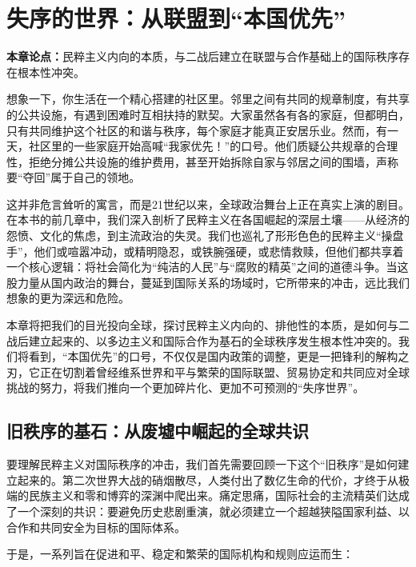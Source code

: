 \chapter{失序的世界：从联盟到“本国优先”}

\textbf{本章论点：}民粹主义内向的本质，与二战后建立在联盟与合作基础上的国际秩序存在根本性冲突。

想象一下，你生活在一个精心搭建的社区里。邻里之间有共同的规章制度，有共享的公共设施，有遇到困难时互相扶持的默契。大家虽然各有各的家庭，但都明白，只有共同维护这个社区的和谐与秩序，每个家庭才能真正安居乐业。然而，有一天，社区里的一些家庭开始高喊“我家优先！”的口号。他们质疑公共规章的合理性，拒绝分摊公共设施的维护费用，甚至开始拆除自家与邻居之间的围墙，声称要“夺回”属于自己的领地。

这并非危言耸听的寓言，而是21世纪以来，全球政治舞台上正在真实上演的剧目。在本书的前几章中，我们深入剖析了民粹主义在各国崛起的深层土壤——从经济的怨愤、文化的焦虑，到主流政治的失灵。我们也巡礼了形形色色的民粹主义“操盘手”，他们或喧嚣冲动，或精明隐忍，或铁腕强硬，或悲情救赎，但他们都共享着一个核心逻辑：将社会简化为“纯洁的人民”与“腐败的精英”之间的道德斗争。当这股力量从国内政治的舞台，蔓延到国际关系的场域时，它所带来的冲击，远比我们想象的更为深远和危险。

本章将把我们的目光投向全球，探讨民粹主义内向的、排他性的本质，是如何与二战后建立起来的、以多边主义和国际合作为基石的全球秩序发生根本性冲突的。我们将看到，“本国优先”的口号，不仅仅是国内政策的调整，更是一把锋利的解构之刃，它正在切割着曾经维系世界和平与繁荣的国际联盟、贸易协定和共同应对全球挑战的努力，将我们推向一个更加碎片化、更加不可预测的“失序世界”。

\section{旧秩序的基石：从废墟中崛起的全球共识}

要理解民粹主义对国际秩序的冲击，我们首先需要回顾一下这个“旧秩序”是如何建立起来的。第二次世界大战的硝烟散尽，人类付出了数亿生命的代价，才终于从极端的民族主义和零和博弈的深渊中爬出来。痛定思痛，国际社会的主流精英们达成了一个深刻的共识：要避免历史悲剧重演，就必须建立一个超越狭隘国家利益、以合作和共同安全为目标的国际体系。

于是，一系列旨在促进和平、稳定和繁荣的国际机构和规则应运而生：

